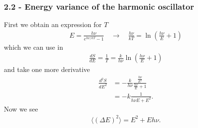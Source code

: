 \documentclass[10pt,a4paper]{article}
\theoremstyle{definition}
\begin{document}
\subsubsection{2.2 - Energy variance of the harmonic oscillator}
First we obtain an expression for $T$
\begin{align}
    E=\frac{h\nu}{e^{h\nu/kT}-1}\quad\rightarrow\quad\frac{h\nu}{kT}=\ln\left(\frac{h\nu}{E}+1\right)
\end{align}
which we can use in
\begin{align}
    \frac{dS}{dE}=\frac{1}{T}=\frac{k}{h\nu}\ln\left(\frac{h\nu}{E}+1\right)
\end{align}
and take one more derivative
\begin{align}
    \frac{d^2S}{dE^2}&=-\frac{k}{h\nu}\frac{\frac{h\nu}{E^2}}{\frac{h\nu}{E}+1}\\
    &=-k\frac{1}{ h\nu E+E^2}.
\end{align}
Now we see
\begin{align}
    \langle(\Delta E)^2\rangle=E^2+E h \nu.
\end{align}
\end{document}
